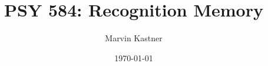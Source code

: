 \documentclass{beamer} %
\title[Recognition Memory]{PSY 584: Recognition Memory}
\institute[METU]{Middle Eastern Technical University}
\author{Marvin Kastner}
\date{\today}
\begin{document}
\begin{frame}
	\titlepage
\end{frame}



\begin{frame}

\end{frame}




\printbibliography
\end{document}
